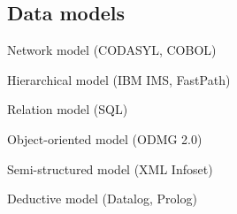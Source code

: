 \subsection{Data models}
\enumstart
	\item Network model (CODASYL, COBOL)
	\item Hierarchical model (IBM IMS, FastPath)
	\item Relation model (SQL)
	\item Object-oriented model (ODMG 2.0)
	\item Semi-structured model (XML Infoset)
	\item Deductive model (Datalog, Prolog)
\enumend
